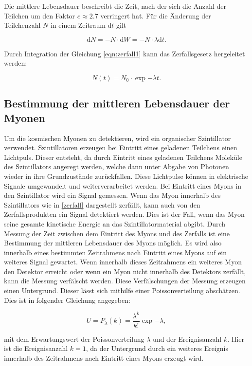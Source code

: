 Die mittlere Lebensdauer beschreibt die Zeit, nach der sich die Anzahl der Teilchen um
den Faktor $e \approx 2.7$ verringert hat.
Für die Änderung der Teilchenzahl $N$ in einem Zeitraum $\text{d}t$ gilt

\begin{equation}
  \text{d}N = - N \cdot \text{d}W = - N \cdot \lambda \text{d}t.
  \label{eqn:zerfall1}
\end{equation}

Durch Integration der Gleichung \ref{eqn:zerfall1} kann das Zerfallsgesetz hergeleitet werden:

\begin{equation}
  N(t) = N_{0} \cdot \exp{- \lambda t}.
  \label{eqn:zerfallsgesetz}
\end{equation}

\subsection{Bestimmung der mittleren Lebensdauer der Myonen}
\label{subsec:BestimmungLebensdauer}

Um die kosmischen Myonen zu detektieren, wird ein organischer Szintillator verwendet.
Szintillatoren erzeugen bei Eintritt eines geladenen Teilchens einen Lichtpuls.
Dieser entsteht, da durch Eintritt eines geladenen Teilchens Moleküle des Szintillators
angeregt werden, welche dann unter Abgabe von Photonen wieder in ihre Grundzustände zurückfallen.
Diese Lichtpulse können in elektrische Signale umgewandelt und weiterverarbeitet werden.
Bei Eintritt eines Myons in den Szintillator wird ein Signal gemessen. Wenn das Myon innerhalb
des Szintillators wie in \ref{zerfall} dargestellt zerfällt, kann auch von den Zerfallsprodukten
ein Signal detektiert werden. Dies ist der Fall, wenn das Myon seine gesamte kinetische Energie
an das Szintillatormaterial abgibt.
Durch Messung der Zeit zwischen dem Eintritt des Myons und des
Zerfalls ist eine Bestimmung der mittleren Lebensdauer des Myons möglich. Es wird also
innerhalb eines bestimmten Zeitrahmens nach Eintritt eines Myons auf ein weiteres Signal
gewartet. Wenn innerhalb dieses Zeitrahmens ein weiteres Myon den Detektor erreicht oder wenn
ein Myon nicht innerhalb des Detektors zerfällt, kann die Messung verfälscht werden.
Diese Verfälschungen der Messung erzeugen einen Untergrund. Dieser lässt sich mithilfe
einer Poissonverteilung abschätzen. Dies ist in folgender Gleichung angegeben:

\begin{equation}
  U = P_{\lambda} (k) = \frac{\lambda^{k}}{k!} \exp{-\lambda},
  \label{eqn:Untergrundrate}
\end{equation}

mit dem Erwartungswert der Poissonverteilung $\lambda$ und der Ereignisanzahl $k$.
Hier ist die Ereignisanzahl $k = 1$, da der Untergrund durch ein weiteres
Ereignis innerhalb des Zeitrahmens nach Eintritt eines Myons erzeugt wird.
